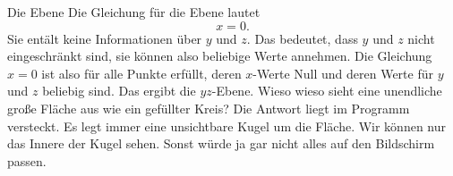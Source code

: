 \begin{surferPage}[Ebene]{Die Ebene}
Die Gleichung für die Ebene lautet \[x=0.\] Sie entält keine Informationen über $y$ und $z$. Das bedeutet, dass $y$ und $z$ nicht eingeschränkt sind, sie können also beliebige Werte annehmen.
Die Gleichung $x=0$ ist also für alle Punkte erfüllt, deren $x$-Werte Null und deren Werte für $y$ und $z$ beliebig sind.  Das ergibt die $yz$-Ebene.
\newline \newline
Wieso wieso sieht eine unendliche große Fläche aus wie ein gef\"ullter Kreis? Die Antwort liegt im Programm versteckt. Es legt immer eine unsichtbare Kugel um die Fläche. Wir können nur das Innere der Kugel sehen. Sonst würde ja gar nicht alles auf den Bildschirm passen.
\end{surferPage}